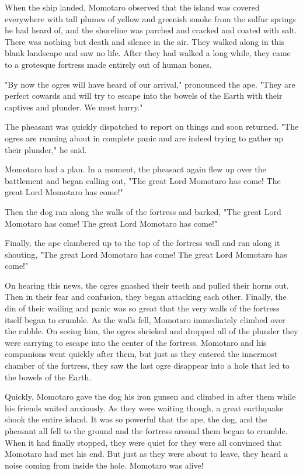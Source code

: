 When the ship landed, Momotaro observed that the island was covered everywhere with tall plumes of yellow and greenish smoke from the sulfur springs he had heard of, and the shoreline was parched and cracked and coated with salt. There was nothing but death and silence in the air. They walked along in this blank landscape and saw no life. After they had walked a long while, they came to a grotesque fortress made entirely out of human bones.

"By now the ogres will have heard of our arrival," pronounced the ape. "They are perfect cowards and will try to escape into the bowels of the Earth with their captives and plunder. We must hurry."

The pheasant was quickly dispatched to report on things and soon returned. "The ogres are running about in complete panic and are indeed trying to gather up their plunder," he said.

Momotaro had a plan. In a moment, the pheasant again flew up over the battlement and began calling out, "The great Lord Momotaro has come! The great Lord Momotaro has come!"

Then the dog ran along the walls of the fortress and barked, "The great Lord Momotaro has come! The great Lord Momotaro has come!"

Finally, the ape clambered up to the top of the fortress wall and ran along it shouting, "The great Lord Momotaro has come! The great Lord Momotaro has come!"

On hearing this news, the ogres gnashed their teeth and pulled their horns out. Then in their fear and confusion, they began attacking each other. Finally, the din of their wailing and panic was so great that the very walls of the fortress itself began to crumble. As the walls fell, Momotaro immediately climbed over the rubble. On seeing him, the ogres shrieked and dropped all of the plunder they were carrying to escape into the center of the fortress. Momotaro and his companions went quickly after them, but just as they entered the innermost chamber of the fortress, they saw the last ogre disappear into a hole that led to the bowels of the Earth.

Quickly, Momotaro gave the dog his iron gunsen and climbed in after them while his friends waited anxiously. As they were waiting though, a great earthquake shook the entire island. It was so powerful that the ape, the dog, and the pheasant all fell to the ground and the fortress around them began to crumble. When it had finally stopped, they were quiet for they were all convinced that Momotaro had met his end. But just as they were about to leave, they heard a noise coming from inside the hole. Momotaro was alive!

